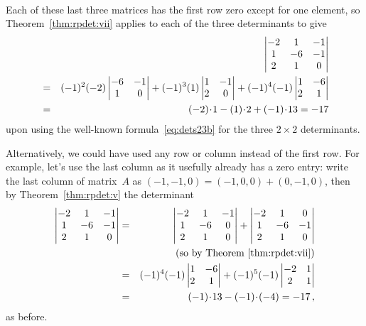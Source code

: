\begin{example}
\begin{solution}
\begin{eqnarray*}
\end{eqnarray*}
Each of these last three matrices has the first row zero except for one element, so Theorem~\ref{thm:rpdet:vii} applies to each of the three determinants to give
\begin{eqnarray*}&&\hspace{-1em}
\begin{vmatrix}   -2&1&-1
\\   1 & -6 & -1
\\   2 &  1 & 0
\end{vmatrix}
\\&=&(-1)^2(-2)\begin{vmatrix}    -6 & -1
\\  1 & 0
\end{vmatrix}
+(-1)^3(1)\begin{vmatrix}    1 &  -1
\\   2 &  0
\end{vmatrix}
+(-1)^4(-1)\begin{vmatrix}   1 & -6 
\\   2 &  1 
\end{vmatrix}
\\&=&(-2)\cdot1-(1)\cdot2+(-1)\cdot13=-17
\end{eqnarray*}
upon using the well-known formula~\eqref{eq:dets23b} for the three \(2\times 2\) determinants.

Alternatively, we could have used any row or column instead of the first row.  
For example, let's use the last column as it usefully already has a zero entry: write the last column of matrix~\(A\) as \((-1,-1,0)=(-1,0,0)+(0,-1,0)\), then by Theorem~\ref{thm:rpdet:v} the determinant
\begin{eqnarray*}
\begin{vmatrix}   -2&1&-1
\\   1 & -6 & -1
\\   2 &  1 & 0
\end{vmatrix}
&=&\begin{vmatrix}   -2&1&-1
\\   1 & -6 & 0
\\   2 &  1 & 0
\end{vmatrix}
+\begin{vmatrix}   -2&1&0
\\   1 & -6 & -1
\\   2 &  1 & 0
\end{vmatrix}
\\&&\quad(\text{so by Theorem~\ref{thm:rpdet:vii}})
\\&=&(-1)^4(-1)\begin{vmatrix}
  1 & -6 
\\   2 &  1 
\end{vmatrix}
+(-1)^5(-1)\begin{vmatrix}   -2&1
\\   2 &  1 
\end{vmatrix}
\\&=&(-1)\cdot 13-(-1)\cdot(-4)=-17\,,
\end{eqnarray*}
as before.
\end{solution}
\end{example}




